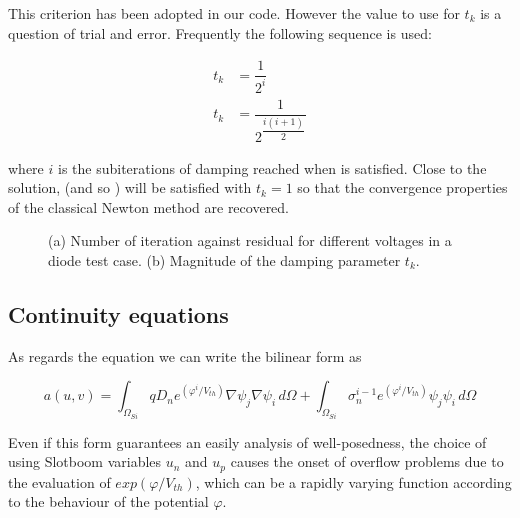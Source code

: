 This criterion has been adopted in our code. However the value to use for $t_k$ is a question of trial and error. Frequently the following sequence is used:

\begin{align}
t_k & = \dfrac{1}{2^i} \\
t_k & = \dfrac{1}{2^{\dfrac{i(i+1)}{2}}}  
\end{align}

where $i$ is the subiterations of damping reached when  is satisfied. Close to the solution,  (and so ) will be satisfied with $t_k=1$ so that the convergence properties of the classical Newton method are recovered.
 

\begin{figure}[!h]
\centering



\caption{(a) Number of iteration against residual for different voltages in a diode test case. (b) Magnitude of the damping parameter $t_k$.}

\end{figure}




\subsection{Continuity equations}
\label{sec: continuity equations}

As regards the  equation we can write the bilinear form as

\begin{equation}
\label{eq: weak formulation displacement}
a(u,v) =  \int_{\Omega_{Si}}  q D_n e^{(\varphi^{i}/V_{th})} \nabla \psi_j \nabla \psi_i \, d\Omega + \int_{\Omega_{Si}} \sigma_n^{i-1} e^{(\varphi^{i}/V_{th})} \psi_j \psi_i \, d\Omega
\end{equation}

Even if this form guarantees an easily analysis of well-posedness, the choice of using Slotboom variables $u_n$ and $u_p$ causes the onset of overflow problems due to the evaluation of $exp(\varphi/V_{th})$, which can be a rapidly varying function according to the behaviour of the potential $\varphi$.


